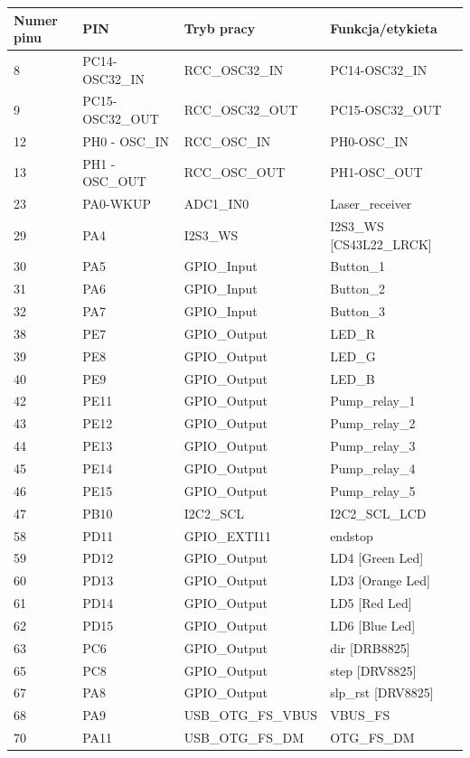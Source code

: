 \documentclass[10pt, a4paper]{article}
\begin{document}
\begin{table}[H]
	\centering
	\begin{tabular}{|l|l|l|l|}
		\hline
		Numer pinu	&	PIN & Tryb pracy & Funkcja/etykieta\\
		\hline
8& PC14-OSC32{\_}IN& RCC{\_}OSC32{\_}IN& PC14-OSC32{\_}IN \\
9& PC15-OSC32{\_}OUT& RCC{\_}OSC32{\_}OUT& PC15-OSC32{\_}OUT\\
12& PH0 - OSC{\_}IN &RCC{\_}OSC{\_}IN& PH0-OSC{\_}IN\\
13& PH1 - OSC{\_}OUT &RCC{\_}OSC{\_}OUT& PH1-OSC{\_}OUT\\
23& PA0-WKUP &ADC1{\_}IN0& Laser{\_}receiver\\
29& PA4& I2S3{\_}WS& I2S3{\_}WS [CS43L22{\_}LRCK]\\
30& PA5& GPIO{\_}Input& Button{\_}1\\
31& PA6& GPIO{\_}Input& Button{\_}2\\
32& PA7& GPIO{\_}Input& Button{\_}3\\
38& PE7& GPIO{\_}Output& LED{\_}R\\
39& PE8& GPIO{\_}Output& LED{\_}G\\
40& PE9& GPIO{\_}Output& LED{\_}B\\
42& PE11& GPIO{\_}Output& Pump{\_}relay{\_}1\\
43& PE12& GPIO{\_}Output& Pump{\_}relay{\_}2\\
44& PE13& GPIO{\_}Output& Pump{\_}relay{\_}3\\
45& PE14& GPIO{\_}Output& Pump{\_}relay{\_}4\\
46& PE15& GPIO{\_}Output& Pump{\_}relay{\_}5\\
47& PB10& I2C2{\_}SCL& I2C2{\_}SCL{\_}LCD\\
58& PD11& GPIO{\_}EXTI11& endstop\\
59& PD12& GPIO{\_}Output& LD4 [Green Led]\\
60& PD13& GPIO{\_}Output& LD3 [Orange Led]\\
61& PD14& GPIO{\_}Output& LD5 [Red Led]\\
62& PD15& GPIO{\_}Output& LD6 [Blue Led]\\
63& PC6& GPIO{\_}Output& dir [DRB8825]\\
65& PC8& GPIO{\_}Output& step [DRV8825]\\
67& PA8& GPIO{\_}Output& slp{\_}rst [DRV8825]\\
68& PA9& USB{\_}OTG{\_}FS{\_}VBUS& VBUS{\_}FS\\
70& PA11& USB{\_}OTG{\_}FS{\_}DM& OTG{\_}FS{\_}DM\\

\end{tabular}
\end{table}
\end{document}

